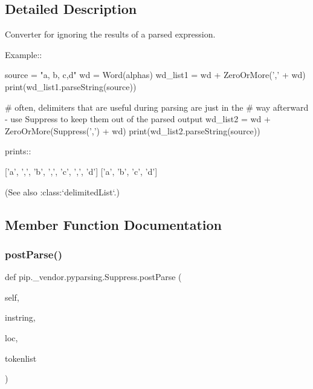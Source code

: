 \subsection{Detailed Description}
\begin{DoxyVerb}Converter for ignoring the results of a parsed expression.

Example::

    source = "a, b, c,d"
    wd = Word(alphas)
    wd_list1 = wd + ZeroOrMore(',' + wd)
    print(wd_list1.parseString(source))

    # often, delimiters that are useful during parsing are just in the
    # way afterward - use Suppress to keep them out of the parsed output
    wd_list2 = wd + ZeroOrMore(Suppress(',') + wd)
    print(wd_list2.parseString(source))

prints::

    ['a', ',', 'b', ',', 'c', ',', 'd']
    ['a', 'b', 'c', 'd']

(See also :class:`delimitedList`.)
\end{DoxyVerb}
 

\subsection{Member Function Documentation}
\mbox{\label{classpip_1_1__vendor_1_1pyparsing_1_1Suppress_af93b0acc8be9a405e027d83a8a9b6cc8}} 
\subsubsection{\texorpdfstring{post\+Parse()}{postParse()}}
{\footnotesize\ttfamily def pip.\+\_\+vendor.\+pyparsing.\+Suppress.\+post\+Parse (\begin{DoxyParamCaption}\item[{}]{self,  }\item[{}]{instring,  }\item[{}]{loc,  }\item[{}]{tokenlist }\end{DoxyParamCaption})}

\mbox{\label{classpip_1_1__vendor_1_1pyparsing_1_1Suppress_ac74b490827cab18def697ce466c0b5fe}} 
